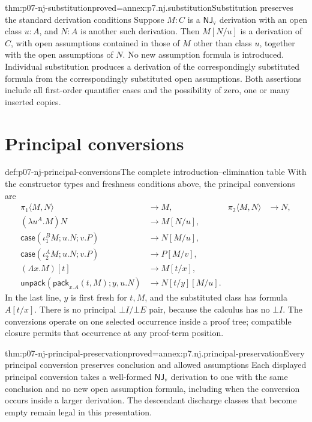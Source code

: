 \begin{hblemma}{thm:p07-nj-substitution}{proved=annex:p7.nj.substitution}{Substitution preserves the standard derivation conditions}
Suppose \(M:C\) is a \(\mathsf{NJ}_{\mathrm v}\) derivation
with an open class \(u:A\), and \(N:A\) is another such
derivation. Then \(M[N/u]\) is a derivation of \(C\), with
open assumptions contained in those of \(M\) other than class
\(u\), together with the open assumptions of \(N\).
No new assumption formula is introduced. Individual substitution
produces a derivation of the correspondingly substituted formula
from the correspondingly substituted open assumptions.
Both assertions include all first-order quantifier cases and
the possibility of zero, one or many inserted copies.
\end{hblemma}

\section{Principal conversions}

\begin{hbdefinition}{def:p07-nj-principal-conversions}{The complete introduction--elimination table}
With the constructor types and freshness conditions above, the
principal conversions are
\[
\begin{aligned}
 \pi_1\langle M,N\rangle&\longrightarrow M,&
 \pi_2\langle M,N\rangle&\longrightarrow N,\\
 (\lambda u^A.M)N&\longrightarrow M[N/u],\\
 \mathsf{case}(\iota_1^B M;u.N;v.P)&\longrightarrow N[M/u],\\
 \mathsf{case}(\iota_2^A M;u.N;v.P)&\longrightarrow P[M/v],\\
 (\Lambda x.M)[t]&\longrightarrow M[t/x],\\
 \mathsf{unpack}(\mathsf{pack}_{x.A}(t,M);y,u.N)
       &\longrightarrow N[t/y][M/u].
\end{aligned}
\]
In the last line, \(y\) is first fresh for \(t,M\), and
the substituted class has formula \(A[t/x]\). There is no
principal \(\bot I/\bot E\) pair, because the calculus has
no \(\bot I\). The conversions operate on one selected
occurrence inside a proof tree; compatible closure permits
that occurrence at any proof-term position.
\end{hbdefinition}

\begin{hbtheorem}{thm:p07-nj-principal-preservation}{proved=annex:p7.nj.principal-preservation}{Every principal conversion preserves conclusion and allowed assumptions}
Each displayed principal conversion takes a well-formed
\(\mathsf{NJ}_{\mathrm v}\) derivation to one with the same
conclusion and no new open assumption formula, including when
the conversion occurs inside a larger derivation. The descendant
discharge classes that become empty remain legal in this presentation.
\end{hbtheorem}

